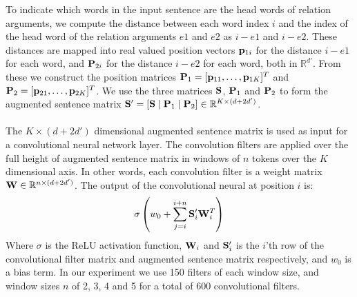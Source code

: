 To indicate which words in the input sentence are the head words of relation arguments, we compute the distance between each word index $i$ and the index of the head word of the relation arguments $e1$ and $e2$ as $i - e1$ and $i - e2$. These distances are mapped into real valued position vectors $\mathbf{p}_{1i}$ for the distance $i - e1$ for each word, and $\mathbf{P}_{2i}$ for the distance $i - e2$ for each word, both in  $\mathbb{R}^{d'}$. From these we construct the position matrices $\mathbf{P}_1 = [\mathbf{p}_{11},\dots,\mathbf{p}_{1K}]^T$ and $\mathbf{P}_2 = [\mathbf{p}_{21},\dots,\mathbf{p}_{2K}]^T$. We use the three matrices $\mathbf{S}$, $\mathbf{P}_1$ and $\mathbf{P}_2$ to form the augmented sentence matrix $\mathbf{S}' = [\mathbf{S} \mid \mathbf{P}_1 \mid \mathbf{P}_2] \in \mathbb{R}^{K \times (d + 2d')}$.
\\\\
The $K \times (d + 2d')$ dimensional augmented sentence matrix is used as input for a convolutional neural network layer. The convolution filters are applied over the full height of augmented sentence matrix in windows of $n$ tokens over the $K$ dimensional axis. In other words, each convolution filter is a weight matrix $\mathbf{W} \in \mathbb{R}^{n \times (d + 2d')}$. The output of the convolutional neural at position $i$ is:
$$
\sigma\left(w_0 + \sum\limits_{j = i}^{i + n}\mathbf{S}'_i\mathbf{W}_i^T\right)
$$
Where $\sigma$ is the ReLU activation function, $\mathbf{W}_i$ and $\mathbf{S}'_i$ is the $i$'th row of the convolutional filter matrix and augmented sentence matrix respectively, and $w_0$ is a bias term. In our experiment we use 150 filters of each window size, and window sizes $n$ of 2, 3, 4 and 5 for a total of 600 convolutional filters.

